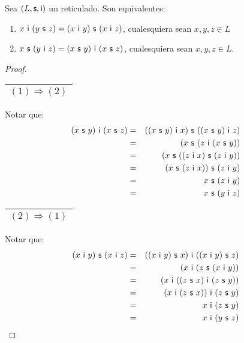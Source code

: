   \begin{lemma}
    \PN Sea $(L, \mathsf{s}, \mathsf{i})$ un reticulado. Son equivalentes:
    \begin{enumerate}[(1)]
      \item $x \ \IN \ (y \ \SU \ z) = (x \ \IN \ y) \ \SU \ (x \ \IN \ z)$, cualesquiera sean $x, y, z \in L$
      \item $x \ \SU \ (y \ \IN \ z) = (x \ \SU \ y) \ \IN \ (x \ \SU \ z)$, cualesquiera sean $x, y, z \in L$.
    \end{enumerate}
  \end{lemma}
  \begin{proof}
    \PN \begin{tabular}{|c|} \hline $(1) \Rightarrow (2)$ \\\hline \end{tabular} Notar que:
    \begin{eqnarray*}
      (x \ \SU \ y) \ \IN \ (x \ \SU \ z) &=& ((x \ \SU \ y) \ \IN \ x) \ \SU \ ((x \ \SU \ y) \ \IN \ z) \\
      &=& (x \ \SU \ (z \ \IN \ (x \ \SU \ y)) \\
      &=& (x \ \SU \ ((z \ \IN \ x) \ \SU \ (z \ \IN \ y)) \\
      &=& (x \ \SU \ (z \ \IN \ x)) \ \SU \ (z \ \IN \ y) \\
      &=& x \ \SU \ (z \ \IN \ y) \\
      &=& x \ \SU \ (y \ \IN \ z)
    \end{eqnarray*}

    \PN \begin{tabular}{|c|} \hline $(2) \Rightarrow (1)$ \\\hline \end{tabular} Notar que:
    \begin{eqnarray*}
      (x \ \IN \ y) \ \SU \ (x \ \IN \ z) &=& ((x \ \IN \ y) \ \SU \ x) \ \IN \ ((x \ \IN \ y) \ \SU \ z) \\
      &=& (x \ \IN \ (z \ \SU \ (x \ \IN \ y)) \\
      &=& (x \ \IN \ ((z \ \SU \ x) \ \IN \ (z \ \SU \ y)) \\
      &=& (x \ \IN \ (z \ \SU \ x)) \ \IN \ (z \ \SU \ y) \\
      &=& x \ \IN \ (z \ \SU \ y) \\
      &=& x \ \IN \ (y \ \SU \ z)
    \end{eqnarray*}
  \end{proof}

